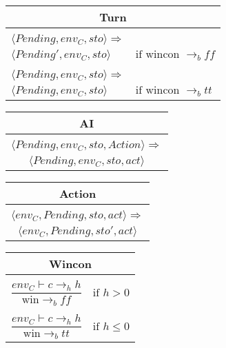 \begin{center}
\begin{tabular}{ l l }
\multicolumn{2}{c}{\textbf{Turn}}\\
\hline
 & \\
$\langle Pending, env_{C}, sto \rangle \Rightarrow$ & \\
$\langle Pending', env_{C}, sto \rangle$ & $\text{if wincon } \rightarrow_{b} ff$\\
 & \\
$\langle Pending, env_{C}, sto \rangle \Rightarrow$ & \\
$\langle Pending, env_{C}, sto \rangle$ & $\text{if wincon } \rightarrow_{b} tt$\\
\end{tabular}
\end{center}

\begin{center}
\begin{tabular}{ c }
\textbf{AI}\\
\hline
 \\
$\langle Pending, env_{C}, sto, Action \rangle \Rightarrow$\\
$\langle Pending, env_{C}, sto, act \rangle$\\
\end{tabular}
\end{center}

\begin{center}
\begin{tabular}{ c }
\textbf{Action}\\
\hline
 \\
$\langle env_{C}, Pending, sto, act \rangle \Rightarrow$\\
$\langle env_{C}, Pending, sto', act \rangle$\\
\end{tabular}
\end{center}

\begin{center}
\begin{tabular}{ l l }
\multicolumn{2}{c}{\textbf{Wincon}}\\
\hline
 & \\
$\dfrac{env_{C} \vdash c \rightarrow_{h} h}{\text{win} \rightarrow_{b} ff}$ & $\text{if } h > 0$\\
 & \\
$\dfrac{env_{C} \vdash c \rightarrow_{h} h}{\text{win} \rightarrow_{b} tt}$ & $\text{if } h \leq 0$\\
\end{tabular}
\end{center}
\pagebreak





